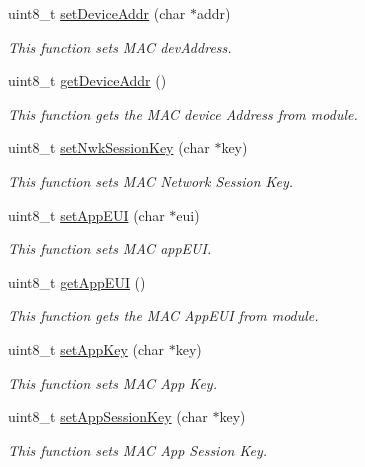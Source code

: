 \begin{DoxyCompactItemize}
uint8\+\_\+t \hyperlink{class_wasp_lo_ra_w_a_n_a0c3b481052a84e75ec9f93b942acd05f}{set\+Device\+Addr} (char $\ast$addr)
\begin{DoxyCompactList}\small\item\em This function sets M\+AC dev\+Address. \end{DoxyCompactList}\item 
uint8\+\_\+t \hyperlink{class_wasp_lo_ra_w_a_n_af73f4b4c7ed1147e7096302b459449f0}{get\+Device\+Addr} ()
\begin{DoxyCompactList}\small\item\em This function gets the M\+AC device Address from module. \end{DoxyCompactList}\item 
uint8\+\_\+t \hyperlink{class_wasp_lo_ra_w_a_n_a690d125487b207e6aa78383f3bd16d65}{set\+Nwk\+Session\+Key} (char $\ast$key)
\begin{DoxyCompactList}\small\item\em This function sets M\+AC Network Session Key. \end{DoxyCompactList}\item 
uint8\+\_\+t \hyperlink{class_wasp_lo_ra_w_a_n_a60ff224c40fa7e455b00676f4268e609}{set\+App\+E\+UI} (char $\ast$eui)
\begin{DoxyCompactList}\small\item\em This function sets M\+AC app\+E\+UI. \end{DoxyCompactList}\item 
uint8\+\_\+t \hyperlink{class_wasp_lo_ra_w_a_n_ace1dbb3c003130c3fbeac7b939c47ec4}{get\+App\+E\+UI} ()
\begin{DoxyCompactList}\small\item\em This function gets the M\+AC App\+E\+UI from module. \end{DoxyCompactList}\item 
uint8\+\_\+t \hyperlink{class_wasp_lo_ra_w_a_n_afde650898fe1dcd03eff640a123dc13a}{set\+App\+Key} (char $\ast$key)
\begin{DoxyCompactList}\small\item\em This function sets M\+AC App Key. \end{DoxyCompactList}\item 
uint8\+\_\+t \hyperlink{class_wasp_lo_ra_w_a_n_a6715e1c8645523efe5efb6710ed25629}{set\+App\+Session\+Key} (char $\ast$key)
\begin{DoxyCompactList}\small\item\em This function sets M\+AC App Session Key. \end{DoxyCompactList}\item 

\end{DoxyCompactItemize}
